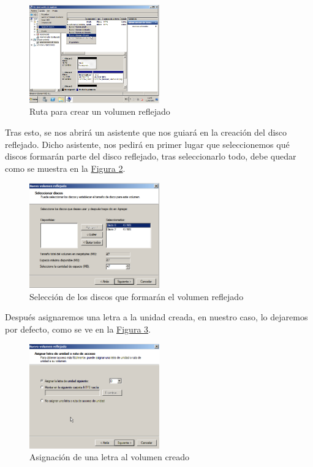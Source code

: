 \documentclass[10pt,a4paper,spanish]{article}
\numberwithin{equation}{section} %
\numberwithin{figure}{section} %
\numberwithin{table}{section} %
\begin{document}
\begin{figure}[!h]
\centering
\includegraphics[width=0.5\textwidth]{14}
\caption{Ruta para crear un volumen reflejado}
\label{ruta}
\end{figure}

Tras esto, se nos abrirá un asistente que nos guiará en la creación del disco reflejado. Dicho asistente, nos pedirá en primer lugar que seleccionemos qué discos formarán parte del disco reflejado, tras seleccionarlo todo, debe quedar como se muestra en la \hyperref[discos]{Figura \ref*{discos}}.

\begin{figure}[!h]
\centering
\includegraphics[width=0.5\textwidth]{15}
\caption{Selección de los discos que formarán el volumen reflejado}
\label{discos}
\end{figure}

Después asignaremos una letra a la unidad creada, en nuestro caso, lo dejaremos por defecto, como se ve en la \hyperref[letra]{Figura \ref*{letra}}.

\begin{figure}[!h]
\centering
\includegraphics[width=0.5\textwidth]{16}
\caption{Asignación de una letra al volumen creado}
\label{letra}
\end{figure}
\end{document}
